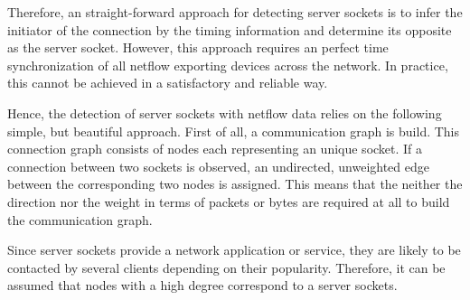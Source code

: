 Therefore, an straight-forward approach for detecting server sockets is to infer the initiator of the connection by the timing information and determine its opposite as the server socket. However, this approach requires an perfect time synchronization of all netflow exporting devices across the network. In practice, this cannot be achieved in a satisfactory and reliable way.

Hence, the detection of server sockets with netflow data relies on the following simple, but beautiful approach. First of all, a communication graph is build. This connection graph consists of nodes each representing an unique socket. If a connection between two sockets is observed, an undirected, unweighted edge between the corresponding two nodes is assigned. This means that the neither the direction nor the weight in terms of packets or bytes are required at all to build the communication graph. 

Since server sockets provide a network application or service, they are likely to be contacted by several clients depending on their popularity. Therefore, it can be assumed that nodes with a high degree correspond to a server sockets.






